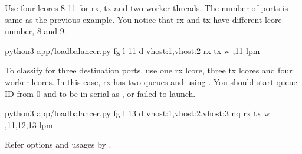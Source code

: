 \documentclass[a4paper,11pt,openany,oneside,english]{sphinxmanual}
\begin{document}
Use four lcores 8-11 for rx, tx and two worker threads.
The number of ports is same as the previous example.
You notice that rx and tx have different lcore number, 8 and 9.

\begin{sphinxVerbatim}[commandchars=\\\{\},formatcom=\footnotesize]
 python3 app/load\PYGZhy{}balancer.py \PYGZhy{}fg \PYGZhy{}l \PYGZhy{}11 \PYGZhy{}d vhost:1,vhost:2 
  \PYGZhy{}rx  
  \PYGZhy{}tx  
  \PYGZhy{}w ,11 
  \PYGZhy{}\PYGZhy{}lpm 
\end{sphinxVerbatim}


To classify for three destination ports, use one rx lcore,
three tx lcores and four worker lcores.
In this case, rx has two queues and using .
You should start queue ID from 0 and to be in serial as ,
or failed to launch.

\begin{sphinxVerbatim}[commandchars=\\\{\},formatcom=\footnotesize]
 python3 app/load\PYGZhy{}balancer.py \PYGZhy{}fg \PYGZhy{}l \PYGZhy{}13 
  \PYGZhy{}d vhost:1,vhost:2,vhost:3 
  \PYGZhy{}nq  
  \PYGZhy{}rx  
  \PYGZhy{}tx  
  \PYGZhy{}w ,11,12,13 
  \PYGZhy{}\PYGZhy{}lpm 
\end{sphinxVerbatim}

Refer options and usages by .
\end{document}

